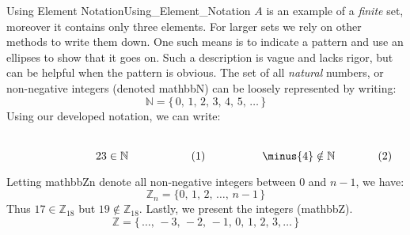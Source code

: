 \begin{fexample}{Using Element Notation}{Using_Element_Notation}
        $A$ is an example of a \textit{finite} set, moreover
        it contains only three elements. For larger sets we rely on other
        methods to write them down. One such means is to indicate a pattern and
        use an ellipses to show that it goes on. Such a description is vague and
        lacks rigor, but can be helpful when the pattern is obvious. The set of
        all \textit{natural} numbers, or non-negative
        integers (denoted \gls{mathbbN}) can be loosely represented by writing:
        \begin{equation}
            \label{eqn:Natural_Numbers_Ellipses}%
            \mathbb{N}=\big\{\,0,\,1,\,2,\,3,\,4,\,5,\,\dots\,\big\}
        \end{equation}
        Using our developed notation, we can write:
        \par
        \begin{subequations}
            \begin{minipage}[b]{0.49\textwidth}
                \centering
                \begin{equation}
                    23\in\mathbb{N}
                \end{equation}
            \end{minipage}
            \hfill
            \begin{minipage}[b]{0.49\textwidth}
                \centering
                \begin{equation}
                    \minus{4}\notin\mathbb{N}
                \end{equation}
            \end{minipage}
        \end{subequations}
        \par\vspace{2.5ex}
        Letting \gls{mathbbZn} denote all non-negative integers between 0 and
        $n-1$, we have:
        \begin{equation}
            \label{eqn:Z_n_Ellipses}%
            \mathbb{Z}_{n}=\big\{0,\,1,\,2,\,\dots,\,n-1\,\big\}
        \end{equation}
        Thus $17\in\mathbb{Z}_{18}$ but $19\notin\mathbb{Z}_{18}$. Lastly, we
        present the integers (\gls{mathbbZ}).
        \begin{equation}
            \label{eqn:Integers_Ellipses}%
            \mathbb{Z}=\big\{\,\dots,\,\minus{3},\,\minus{2},\,\minus{1},
                             \,0,\,1,\,2,\,3,\dots\,\big\}
        \end{equation}
    \end{fexample}
